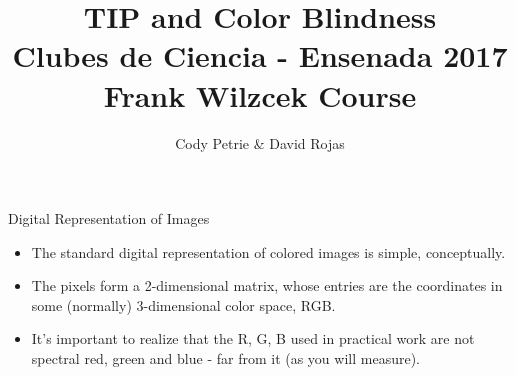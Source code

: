 \documentclass{beamer}
\title[{\color{white}{Day 3}}]{{\Huge TIP and Color Blindness} \\ {\normalsize Clubes de Ciencia - Ensenada 2017 \\ Frank Wilzcek Course}}
\author{Cody Petrie \& David Rojas}
\institute{Universidad Aut\'onoma de Baja California}
\date{}
\begin{document}
\begin{frame}
   \titlepage
\end{frame}



\begin{frame}{Digital Representation of Images}
   \begin{itemize}
      \item The standard digital representation of colored images is simple, conceptually.
      \item The pixels form a 2-dimensional matrix, whose entries are the coordinates in some (normally) 3-dimensional color space, RGB.
      \item It's important to realize that the R, G, B used in practical work are not spectral red, green and blue - far from it (as you will measure).
   \end{itemize}
\end{frame}
\end{document}
